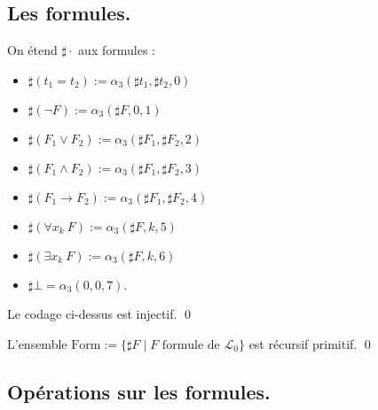 \documentclass[./main]{subfiles}
\begin{document}
 \subsection{Les formules.}
 \begin{defn}
   On étend $\sharp \cdot $ aux formules :
   \begin{itemize}
     \item $\sharp (t_1 = t_2) := \alpha_3(\sharp t_1, \sharp t_2, 0)$
     \item $\sharp (\lnot F) := \alpha_3(\sharp F, 0, 1)$
     \item $\sharp (F_1 \lor F_2) := \alpha_3(\sharp F_1, \sharp F_2, 2)$
     \item $\sharp (F_1 \land F_2) := \alpha_3(\sharp F_1, \sharp F_2, 3)$
     \item $\sharp (F_1 \to F_2) := \alpha_3(\sharp F_1, \sharp F_2, 4)$
     \item $\sharp (\forall x_k \: F) := \alpha_3(\sharp F, k, 5)$
     \item $\sharp (\exists  x_k \: F) := \alpha_3(\sharp F, k, 6)$
     \item $\sharp \bot  = \alpha_3(0, 0, 7)$.
   \end{itemize}
 \end{defn}

 \begin{lem}
   Le codage ci-dessus est injectif.
   \qed
 \end{lem}

 \begin{lem}
   L'ensemble $\mathrm{Form} := \{\sharp F  \mid F \text{ formule de } \mathcal{L}_0\} $ est récursif primitif.
   \qed
 \end{lem}

 \subsection{Opérations sur les formules.}
\end{document}
